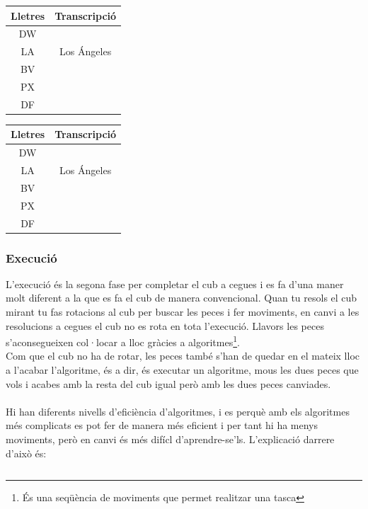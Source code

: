 \begin{table}[h]
    \begin{minipage}{.5\linewidth}
        \centering
        \begin{tabular}{|c|c|}
            \hline
            Lletres & Transcripció\\\hline
            DW &             \\\hline
            LA & Los Ángeles \\\hline
            BV &             \\\hline
            PX &             \\\hline
            DF &             \\\hline 
        \end{tabular}
    \end{minipage}
    \begin{minipage}{.5\linewidth}
        \centering
        \begin{tabular}{|c|c|}
            \hline
            Lletres & Transcripció\\\hline
            DW &             \\\hline
            LA & Los Ángeles \\\hline
            BV &             \\\hline
            PX &             \\\hline
            DF &             \\\hline 
        \end{tabular}
    \end{minipage} 
\end{table}


\subsubsection{Execució}

L'execució és la segona fase per completar el cub a cegues i es fa d'una maner molt diferent a la que es fa el cub de manera convencional. Quan tu resols el cub mirant tu fas rotacions al cub per buscar les peces i fer moviments, en canvi a les resolucions a cegues el cub no es rota en tota l'execució. Llavors les peces s'aconsegueixen col·locar a lloc gràcies a algoritmes\footnote{És una seqüència de moviments que permet realitzar una tasca}.
\\Com que el cub no ha de rotar, les peces també s'han de quedar en el mateix lloc a l'acabar l'algoritme, és a dir, és executar un algoritme, mous les dues peces que vols i acabes amb la resta del cub igual però amb les dues peces canviades. 
\\\\Hi han diferents nivells d'eficiència d'algoritmes, i es perquè amb els algoritmes més complicats es pot fer de manera més eficient i per tant hi ha menys moviments, però en canvi és més difícl d'aprendre-se'ls. L'explicació darrere d'això és:

$$  $$
    






